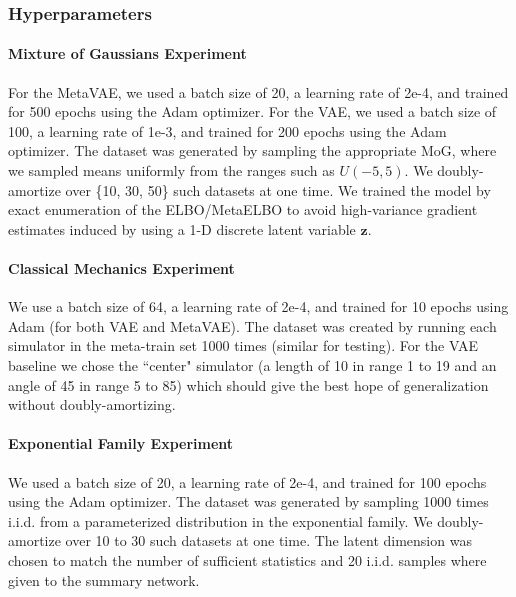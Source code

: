 \subsubsection{Hyperparameters}
\paragraph{Mixture of Gaussians Experiment} For the MetaVAE, we used a batch size of 20, a learning rate of 2e-4, and trained for 500 epochs using the Adam optimizer. For the VAE, we used a batch size of 100, a learning rate of 1e-3, and trained for 200 epochs using the Adam optimizer. The dataset was generated by sampling the appropriate MoG, where we sampled means uniformly from the ranges such as $U(-5, 5)$. We doubly-amortize over \{10, 30, 50\} such datasets at one time. We trained the model by exact enumeration of the ELBO/MetaELBO to avoid high-variance gradient estimates induced by using a 1-D discrete latent variable $\mathbf{z}$.

\paragraph{Classical Mechanics Experiment} We use a batch size of 64, a learning rate of 2e-4, and trained for 10 epochs using Adam (for both VAE and MetaVAE). The dataset was created by running each simulator in the meta-train set 1000 times (similar for testing). For the VAE baseline we chose the ``center" simulator (a length of 10 in range 1 to 19 and an angle of 45 in range 5 to 85) which should give the best hope of generalization without doubly-amortizing. 


\paragraph{Exponential Family Experiment} We used a batch size of 20, a learning rate of 2e-4, and trained for 100 epochs using the Adam optimizer. The dataset was generated by sampling 1000 times i.i.d. from a parameterized distribution in the exponential family. We doubly-amortize over 10 to 30 such datasets at one time. The latent dimension was chosen to match the number of sufficient statistics and 20 i.i.d. samples where given to the summary network.

